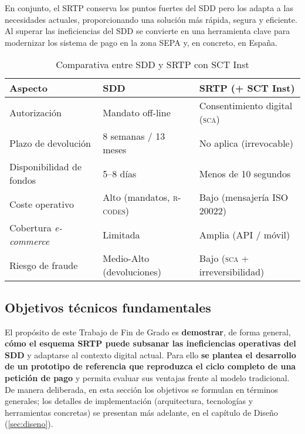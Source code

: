 En conjunto, el SRTP conserva los puntos fuertes del SDD pero los adapta a las necesidades actuales, proporcionando una solución más rápida, segura y eficiente. Al superar las ineficiencias del SDD se convierte en una herramienta clave para modernizar los sistema de pago en la zona SEPA y, en concreto, en España.
\vspace{0.5cm}

\begin{table}[h]
\centering
\caption{Comparativa entre SDD y SRTP con SCT Inst}
\label{tab:comparativa-sdd-srtp}
\renewcommand{\arraystretch}{1.2}
\begin{tabular}{@{}L{4.8cm}C{4.8cm}C{4.8cm}@{}}
\toprule
\textbf{Aspecto} & \textbf{SDD} & \textbf{SRTP (+ SCT Inst)} \\
\midrule
Autorización & Mandato off-line & Consentimiento digital (\textsc{sca}) \\
Plazo de devolución & 8 semanas / 13 meses & No aplica (irrevocable) \\
Disponibilidad de fondos & 5--8 días & Menos de 10 segundos \\
Coste operativo & Alto (mandatos, \textsc{r-codes}) & Bajo (mensajería ISO 20022) \\
Cobertura \emph{e-commerce} & Limitada & Amplia (API / móvil) \\
Riesgo de fraude & Medio-Alto (devoluciones) & Bajo (\textsc{sca} + irreversibilidad) \\
\bottomrule
\end{tabular}
\end{table}

\bigskip


\subsection{Objetivos técnicos fundamentales}
\label{subsec:Objetivos}
El propósito de este Trabajo de Fin de Grado es \textbf{demostrar}, de forma general, \textbf{cómo el esquema SRTP puede subsanar las ineficiencias operativas del SDD} y adaptarse al contexto digital actual. Para ello \textbf{se plantea el desarrollo de un prototipo de referencia que reproduzca el ciclo completo de una petición de pago} y permita evaluar sus ventajas frente al modelo tradicional. De manera deliberada, en esta sección los objetivos se formulan en términos generales; los detalles de implementación (arquitectura, tecnologías y herramientas concretas) se presentan más adelante, en el capítulo de Diseño (\ref{sec:diseno}).

